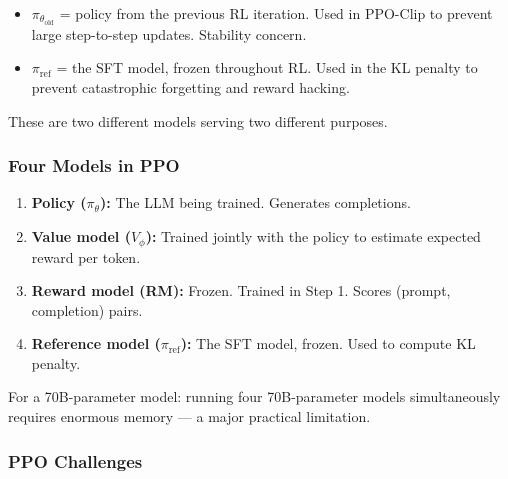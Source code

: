 \documentclass[11pt, a4paper]{article}
\begin{document}
\begin{notebox}
\begin{itemize}[leftmargin=1.5em]
  \item \textbf{$\pi_{\theta_{\text{old}}}$} = policy from the previous RL iteration. Used in PPO-Clip to prevent large step-to-step updates. Stability concern.
  \item \textbf{$\pi_{\text{ref}}$} = the SFT model, frozen throughout RL. Used in the KL penalty to prevent catastrophic forgetting and reward hacking.
\end{itemize}
These are two different models serving two different purposes.
\end{notebox}

\subsubsection{Four Models in PPO}

\begin{defbox}
\begin{enumerate}[leftmargin=1.5em]
  \item \textbf{Policy ($\pi_\theta$):} The LLM being trained. Generates completions.
  \item \textbf{Value model ($V_\phi$):} Trained jointly with the policy to estimate expected reward per token.
  \item \textbf{Reward model (RM):} Frozen. Trained in Step 1. Scores (prompt, completion) pairs.
  \item \textbf{Reference model ($\pi_{\text{ref}}$):} The SFT model, frozen. Used to compute KL penalty.
\end{enumerate}
For a 70B-parameter model: running four 70B-parameter models simultaneously requires enormous memory --- a major practical limitation.
\end{defbox}

\subsubsection{PPO Challenges}
\end{document}
